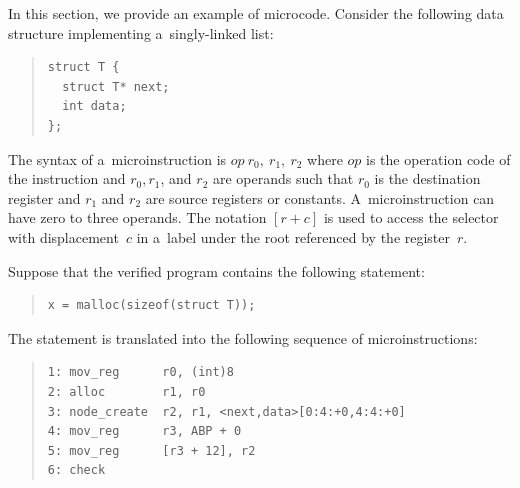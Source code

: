 {In this section, we provide an example of \forester microcode.
Consider the following data structure implementing a~singly-linked list:
%
\begin{quote}
\begin{verbatim}
struct T {
  struct T* next;
  int data;
};
\end{verbatim}
\end{quote}
%
The syntax of a~microinstruction is $\mathit{op}\ r_0,\ r_1,\ r_2$
where $\mathit{op}$ is the operation code of the instruction and
$r_0, r_1$, and $r_2$ are operands such that $r_0$ is the destination register and
$r_1$ and $r_2$ are source registers or constants.
A~microinstruction can have zero to three operands.
The notation $[r+c]$ is used to access the selector with displacement~$c$ in a~label
under the root referenced by the register~$r$.
% 	

Suppose that the verified program contains the following statement:
%
\begin{quote}
\begin{verbatim}
x = malloc(sizeof(struct T));
\end{verbatim}
\end{quote}
%
The statement is translated into the following sequence of microinstructions:
%
\begin{quote}
\begin{verbatim}
1: mov_reg      r0, (int)8
2: alloc        r1, r0
3: node_create  r2, r1, <next,data>[0:4:+0,4:4:+0]
4: mov_reg      r3, ABP + 0
5: mov_reg      [r3 + 12], r2
6: check
\end{verbatim}
\end{quote}

}
